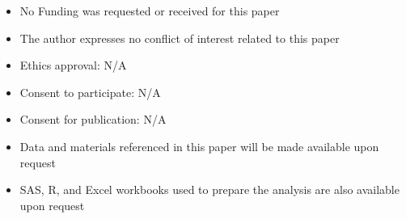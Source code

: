 \documentclass[sn-mathphys]{sn-jnl}%
\theoremstyle{thmstyleone}%
\theoremstyle{thmstyletwo}%
\theoremstyle{thmstylethree}%
\begin{document}

\begin{itemize}
\item No Funding was requested or received for this paper
\item The author expresses no conflict of interest related to this paper
\item Ethics approval: N/A
\item Consent to participate: N/A
\item Consent for publication: N/A
\item Data and materials referenced in this paper will be made available upon request
\item SAS, R, and Excel workbooks used to prepare the analysis are also available upon request
\end{itemize}






\end{document}
